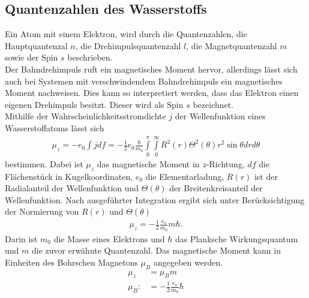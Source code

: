 \subsection{Quantenzahlen des Wasserstoffs}
Ein Atom mit einem Elektron, wird durch die Quantenzahlen, die Hauptquantenzal $n$, die Drehimpulsquantenzahl $l$, die Magnetquantenzahl $m$ sowie der Spin $s$ beschrieben.\\
Der Bahndrehimpuls ruft ein magnetisches Moment hervor, allerdings lässt sich auch bei Systemen mit verschwindendem Bahndrehimpuls ein magnetisches Moment nachweisen. 
Dies kann so interpretiert werden, dass das Elektron einen eigenen Drehimpuls besitzt. 
Dieser wird als Spin $s$ bezeichnet.\\
Mithilfe der Wahrscheinlichkeitsstromdichte $j$ der Wellenfunktion eines Wasserstoffatoms lässt sich
\begin{align}
	\mu_z=-e_0\int j df=-\frac{1}{2}e_0\frac{\hbar}{m_0}\int\limits_{0}^{\pi}\int\limits_{0}^{\infty} R^2(r)\Theta^2(\theta)r^2\sin\theta drd\theta
\end{align}
bestimmen. 
Dabei ist $\mu_z$ das magnetische Moment in $z$-Richtung, $df$ die Flächenstück in Kugelkoordinaten, $e_0$ die Elementarladung, $R(r)$ ist der Radialanteil der Wellenfunktion und $\Theta(\theta)$ der Breitenkreisanteil der Wellenfunktion.
Nach ausgeführter Integration ergibt sich unter Berücksichtigung der Normierung von $R(r)$ und $\Theta(\theta)$  
\begin{align}
	\mu_z=-\frac{1}{2}\frac{e_o}{m_0}m\hbar.
\end{align}
Darin ist $m_0$ die Masse eines Elektrons und $\hbar$ das Planksche Wirkungsquantum und $m$ die zuvor erwähnte Quantenzahl. 
Das magnetische Moment kann in Einheiten des Bohrschen Magnetons $\mu_B$ angegeben werden.
\begin{align}
	\mu_z &= \mu_B m\\
	\mu_B:&=-\frac{1}{2}\frac{e_0}{m_0}\hbar
\end{align}
